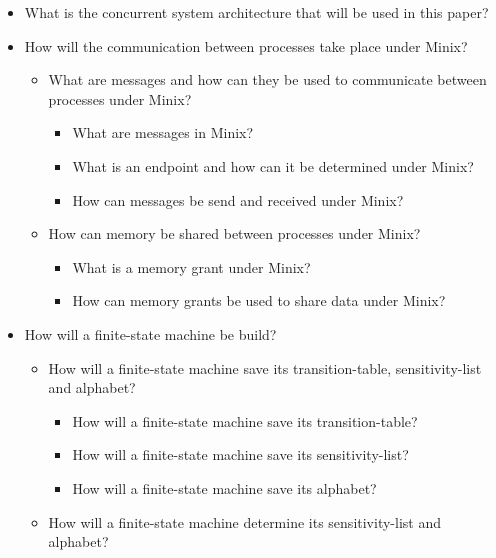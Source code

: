 \begin{itemize}
\item
  What is the concurrent system architecture that will be used in this
  paper?
\item
  How will the communication between processes take place under Minix?

  \begin{itemize}
  \tightlist
  \item
    What are messages and how can they be used to communicate between
    processes under Minix?

    \begin{itemize}
    \tightlist
    \item
      What are messages in Minix?
    \item
      What is an endpoint and how can it be determined under Minix?
    \item
      How can messages be send and received under Minix?
    \end{itemize}
  \item
    How can memory be shared between processes under Minix?

    \begin{itemize}
    \tightlist
    \item
      What is a memory grant under Minix?
    \item
      How can memory grants be used to share data under Minix?
    \end{itemize}
  \end{itemize}
\item
  How will a finite-state machine be build?

  \begin{itemize}
  \tightlist
  \item
    How will a finite-state machine save its transition-table,
    sensitivity-list and alphabet?

    \begin{itemize}
    \tightlist
    \item
      How will a finite-state machine save its transition-table?
    \item
      How will a finite-state machine save its sensitivity-list?
    \item
      How will a finite-state machine save its alphabet?
    \end{itemize}
  \item
    How will a finite-state machine determine its sensitivity-list and
    alphabet?


\end{itemize}
\end{itemize}
